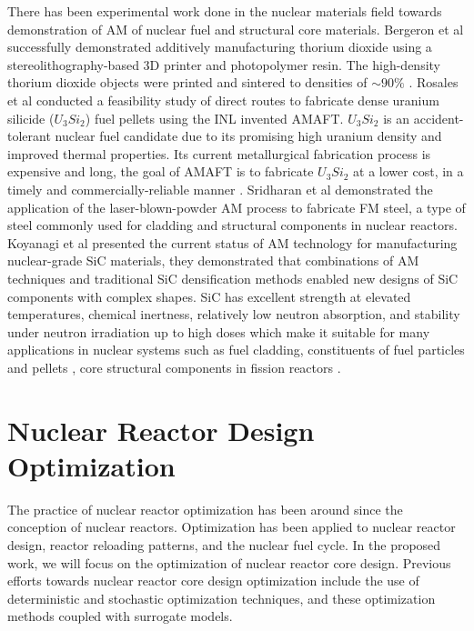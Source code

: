 There has been experimental work done in the nuclear materials field towards 
demonstration of \gls{AM} of nuclear fuel and structural core materials. 
Bergeron et al \cite{bergeron_early_2018} successfully demonstrated additively 
manufacturing thorium dioxide using a stereolithography-based 3D printer 
and photopolymer resin. 
The high-density thorium dioxide objects were printed and sintered to densities 
of $\sim90\%$ \cite{bergeron_early_2018}. 
Rosales et al \cite{rosales_characterizing_2019} conducted a feasibility study 
of direct routes to fabricate dense uranium silicide ($U_3Si_2$) fuel pellets 
using the \gls{INL} invented \gls{AMAFT}. 
$U_3Si_2$ is an accident-tolerant nuclear fuel candidate due to its promising 
high uranium density and improved thermal properties. 
Its current metallurgical fabrication process is expensive and long, the goal of
\gls{AMAFT} is to fabricate $U_3Si_2$ at a lower cost, in a timely and
commercially-reliable manner \cite{rosales_characterizing_2019}.  
Sridharan et al \cite{sridharan_performance_2019} demonstrated the application of
the laser-blown-powder \gls{AM} process to fabricate \gls{FM} steel, a type of 
steel commonly used for cladding and structural components in nuclear reactors. 
Koyanagi et al \cite{koyanagi_additive_2020} presented the current status of 
\gls{AM} technology for manufacturing nuclear-grade \gls{SiC} materials, they 
demonstrated that combinations of \gls{AM} techniques and traditional \gls{SiC} 
densification methods enabled new designs of \gls{SiC} components with complex shapes. 
\gls{SiC} has excellent strength at elevated temperatures, chemical inertness, 
relatively low neutron absorption, and stability under neutron irradiation up 
to high doses \cite{sauder_ceramic_2014, snead_handbook_2007,koyanagi_additive_2020} 
which make it suitable for many applications in nuclear systems such as fuel cladding, 
constituents of fuel particles \cite{snead_handbook_2007} and pellets
\cite{terrani_progress_2015}, core structural components in fission reactors 
\cite{sauder_ceramic_2014}. 

\section{Nuclear Reactor Design Optimization}
The practice of nuclear reactor optimization has been around since the conception of 
nuclear reactors. 
Optimization has been applied to nuclear reactor design, reactor reloading 
patterns, and the nuclear fuel cycle.  
In the proposed work, we will focus on the optimization of nuclear reactor 
core design. 
Previous efforts towards nuclear reactor core design optimization include the use 
of deterministic and stochastic optimization techniques, and these optimization 
methods coupled with surrogate models. 

